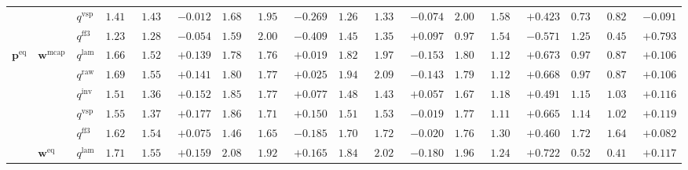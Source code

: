 \documentclass[eng]{kjas3}
\begin{document}
\begin{table}[t]
{\begin{tabular}{lll ccc ccc ccc ccc ccc}
 &  & $q^{\mathrm{vsp}}$ & $1.418$ & $1.430$ & \cellcolor{negred!50}$-0.012$ & $1.688$ & $1.957$ & \cellcolor{negred!50}$-0.269$ & $1.265$ & $1.338$ & \cellcolor{negred!50}$-0.074$ & $2.007$ & $1.584$ & \cellcolor{posgreen!50}$+0.423$ & $0.737$ & $0.828$ & \cellcolor{negred!50}$-0.091$ \\
 &  & $q^{\mathrm{ff3}}$ & $1.233$ & $1.288$ & \cellcolor{negred!50}$-0.054$ & $1.595$ & $2.004$ & \cellcolor{negred!50}$-0.409$ & $1.455$ & $1.358$ & \cellcolor{posgreen!50}$+0.097$ & $0.970$ & $1.541$ & \cellcolor{negred!50}$-0.571$ & $1.251$ & $0.458$ & \cellcolor{posgreen!50}$+0.793$ \\
\midrule
$\mathbf{p}^{\mathrm{eq}}$ & $\mathbf{w}^{\mathrm{mcap}}$ & $q^{\mathrm{lam}}$ & $1.662$ & $1.523$ & \cellcolor{posgreen!50}$+0.139$ & $1.784$ & $1.765$ & \cellcolor{posgreen!50}$+0.019$ & $1.821$ & $1.974$ & \cellcolor{negred!50}$-0.153$ & $1.800$ & $1.127$ & \cellcolor{posgreen!50}$+0.673$ & $0.978$ & $0.872$ & \cellcolor{posgreen!50}$+0.106$ \\
 &  & $q^{\mathrm{raw}}$ & $1.696$ & $1.555$ & \cellcolor{posgreen!50}$+0.141$ & $1.800$ & $1.775$ & \cellcolor{posgreen!50}$+0.025$ & $1.947$ & $2.090$ & \cellcolor{negred!50}$-0.143$ & $1.795$ & $1.127$ & \cellcolor{posgreen!50}$+0.668$ & $0.978$ & $0.872$ & \cellcolor{posgreen!50}$+0.106$ \\
 &  & $q^{\mathrm{inv}}$ & $1.519$ & $1.367$ & \cellcolor{posgreen!50}$+0.152$ & $1.851$ & $1.774$ & \cellcolor{posgreen!50}$+0.077$ & $1.489$ & $1.431$ & \cellcolor{posgreen!50}$+0.057$ & $1.674$ & $1.183$ & \cellcolor{posgreen!50}$+0.491$ & $1.150$ & $1.034$ & \cellcolor{posgreen!50}$+0.116$ \\
 &  & $q^{\mathrm{vsp}}$ & $1.555$ & $1.378$ & \cellcolor{posgreen!50}$+0.177$ & $1.866$ & $1.716$ & \cellcolor{posgreen!50}$+0.150$ & $1.516$ & $1.534$ & \cellcolor{negred!50}$-0.019$ & $1.775$ & $1.110$ & \cellcolor{posgreen!50}$+0.665$ & $1.141$ & $1.022$ & \cellcolor{posgreen!50}$+0.119$ \\
 &  & $q^{\mathrm{ff3}}$ & $1.623$ & $1.548$ & \cellcolor{posgreen!50}$+0.075$ & $1.468$ & $1.653$ & \cellcolor{negred!50}$-0.185$ & $1.701$ & $1.721$ & \cellcolor{negred!50}$-0.020$ & $1.767$ & $1.307$ & \cellcolor{posgreen!50}$+0.460$ & $1.724$ & $1.642$ & \cellcolor{posgreen!50}$+0.082$ \\
\cmidrule(lr){2-18}
 & $\mathbf{w}^{\mathrm{eq}}$ & $q^{\mathrm{lam}}$ & $1.715$ & $1.556$ & \cellcolor{posgreen!50}$+0.159$ & $2.088$ & $1.923$ & \cellcolor{posgreen!50}$+0.165$ & $1.844$ & $2.025$ & \cellcolor{negred!50}$-0.180$ & $1.961$ & $1.240$ & \cellcolor{posgreen!50}$+0.722$ & $0.529$ & $0.411$ & \cellcolor{posgreen!50}$+0.117$ \\

\end{tabular}}
\end{table}
\end{document}
